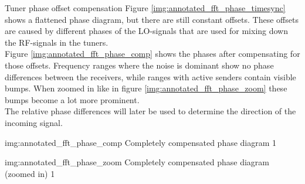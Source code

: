 \begin{subchapter}{Tuner phase offset compensation}
  Figure \ref{img:annotated_fft_phase_timesync} shows a flattened
  phase diagram, but there are still constant offsets.
  These offsets are caused by different phases of the LO-signals
  that are used for mixing down the RF-signals in the tuners. \\

  Figure \ref{img:annotated_fft_phase_comp} shows the phases
  after compensating for those offsets. Frequency ranges where
  the noise is dominant show no phase differences between
  the receivers, while ranges with active senders contain
  visible bumps. When zoomed in like in figure \ref{img:annotated_fft_phase_zoom}
  these bumps become a lot more prominent. \\

  The relative phase differences will later be used to
  determine the direction of the incoming signal.

               {img:annotated_fft_phase_comp}
               {Completely compensated phase diagram}
               {1}

               {img:annotated_fft_phase_zoom}
               {Completely compensated phase diagram (zoomed in)}
               {1}
\end{subchapter}
